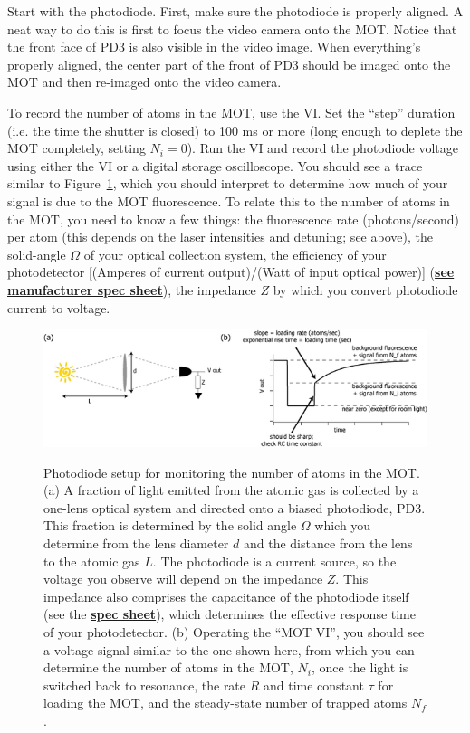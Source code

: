\documentclass{../lab}
\begin{document}
Start with the photodiode. First, make sure the photodiode is properly aligned. A neat way to do this is first to focus the video camera onto the MOT. Notice that the front face of PD3 is also visible in the video image. When everything's properly aligned, the center part of the front of PD3 should be imaged onto the MOT and then re-imaged onto the video camera.

To record the number of atoms in the MOT, use the VI. Set the ``step'' duration (i.e. the time the shutter is closed) to 100 ms or more (long enough to deplete the MOT completely, setting $N_i = 0$). Run the VI and record the photodiode voltage using either the VI or a digital storage oscilloscope. You should see a trace similar to Figure~\ref{fig:600px-PD3_v2}, which you should interpret to determine how much of your signal is due to the MOT fluorescence. To relate this to the number of atoms in the MOT, you need to know a few things: the fluorescence rate (photons/second) per atom (this depends on the laser intensities and detuning; see above), the solid-angle $\Omega$ of your optical collection system, the efficiency of your photodetector [(Amperes of current output)/(Watt of input optical power)] (\href{http://experimentationlab.berkeley.edu/sites/default/files/images/Photodiode\_info.pdf}{\textbf{see manufacturer spec sheet}}), the impedance $Z$ by which you convert photodiode current to voltage.

\begin{figure}[h]
    \centering
    \href{http://experimentationlab.berkeley.edu/sites/default/files/images/600px-PD3_v2.png}{\includegraphics[width=0.9\linewidth]{images/600px-PD3_v2.png}}
    \caption{Photodiode setup for monitoring the number of atoms in the MOT. (a) A fraction of light emitted from the atomic gas is collected by a one-lens optical system and directed onto a biased photodiode, PD3. This fraction is determined by the solid angle $\Omega$ which you determine from the lens diameter $d$ and the distance from the lens to the atomic gas $L$. The photodiode is a current source, so the voltage you observe will depend on the impedance $Z$. This impedance also comprises the capacitance of the photodiode itself (see the \href{http://experimentationlab.berkeley.edu/sites/default/files/images/Photodiode\_info.pdf}{\textbf{spec sheet}}), which determines the effective response time of your photodetector. (b) Operating the ``MOT VI'', you should see a voltage signal similar to the one shown here, from which you can determine the number of atoms in the MOT, $N_i$, once the light is switched back to resonance, the rate $R$ and time constant $\tau$ for loading the MOT, and the steady-state number of trapped atoms $N_f$.}
    \label{fig:600px-PD3_v2}
\end{figure}
\end{document}
